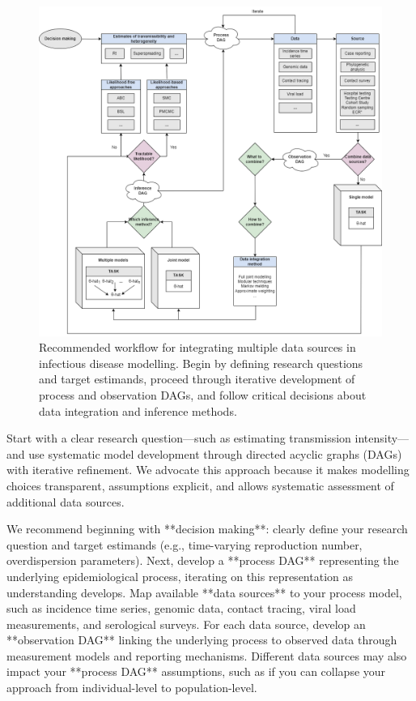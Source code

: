 \documentclass{article}
\begin{document}
\begin{figure}[htbp]
    \centering
    \includegraphics[width=\textwidth]{figures/workflow-schematic.png}
    \caption{Recommended workflow for integrating multiple data sources in infectious disease modelling. Begin by defining research questions and target estimands, proceed through iterative development of process and observation DAGs, and follow critical decisions about data integration and inference methods.}
    \label{fig:workflow}
\end{figure}
Start with a clear research question—such as estimating transmission intensity—and use systematic model development through directed acyclic graphs (DAGs) with iterative refinement.
We advocate this approach because it makes modelling choices transparent, assumptions explicit, and allows systematic assessment of additional data sources.

We recommend beginning with **decision making**: clearly define your research question and target estimands (e.g., time-varying reproduction number, overdispersion parameters).
Next, develop a **process DAG** representing the underlying epidemiological process, iterating on this representation as understanding develops.
Map available **data sources** to your process model, such as incidence time series, genomic data, contact tracing, viral load measurements, and serological surveys.
For each data source, develop an **observation DAG** linking the underlying process to observed data through measurement models and reporting mechanisms.
Different data sources may also impact your **process DAG** assumptions, such as if you can collapse your approach from individual-level to population-level.
\end{document}

